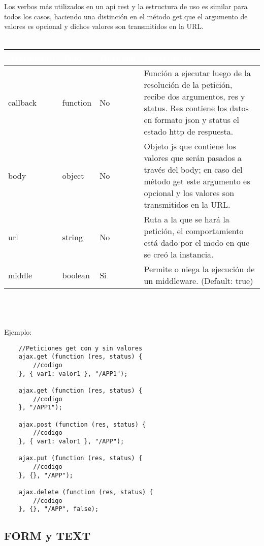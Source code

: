 \documentclass[10pt]{article}
\begin{document}
Los verbos más utilizados en un api rest y la estructura de uso es similar para todos los casos, haciendo una distinción en el método get que el argumento de valores es opcional y dichos valores son transmitidos en la URL.
\\\\
\begin{tabular}{|m{1.8cm}|m{1.5cm}|m{1.5cm}|m{9.4cm}|}
	\hline
	\rowcolor{black}\textcolor{white}{Argumento} & \textcolor{white}{Tipo} & \textcolor{white}{Opcional} & \textcolor{white}{Descripción} \\
	\hline
	callback & function & No & Función a ejecutar luego de la resolución de la petición, recibe dos argumentos, res y status. Res contiene los datos en formato json y status el estado http de respuesta. \\
	\hline
	body & object & No & Objeto js que contiene los valores que serán pasados a través del body; en caso del método get este argumento es opcional y los valores son transmitidos en la URL. \\
	\hline
	url & string & No & Ruta a la que se hará la petición, el comportamiento está dado por el modo en que se creó la instancia. \\
	\hline
	middle & boolean & Si & Permite o niega la ejecución de un middleware. (Default: true) \\
	\hline
\end{tabular}
\\\\\\
Ejemplo: 
\begin{lstlisting}
	//Peticiones get con y sin valores
	ajax.get (function (res, status) {
		//codigo
	}, { var1: valor1 }, "/APP1");
	
	ajax.get (function (res, status) {
		//codigo
	}, "/APP1");
	
	ajax.post (function (res, status) {
		//codigo
	}, { var1: valor1 }, "/APP");
	
	ajax.put (function (res, status) {
		//codigo
	}, {}, "/APP");
	
	ajax.delete (function (res, status) {
		//codigo
	}, {}, "/APP", false);
\end{lstlisting}

\subsection{FORM y TEXT}
\end{document}
